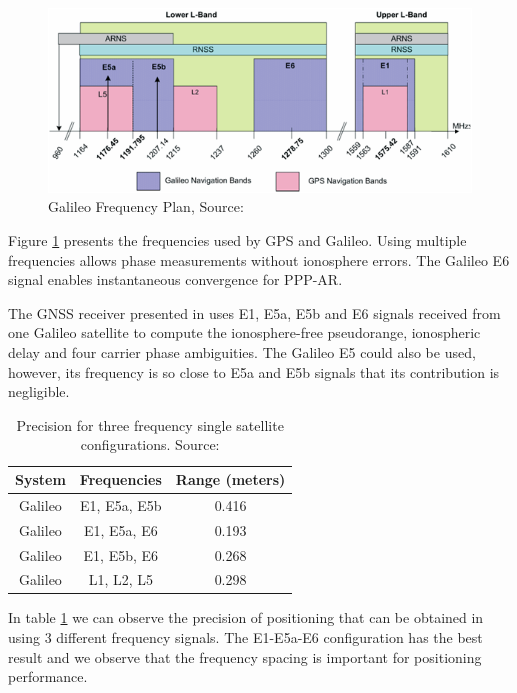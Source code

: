 \begin{figure}[h]
\centering
\includegraphics{img/Galileo_Frequency_Plan.png}
\caption{Galileo Frequency Plan, Source:\cite{galileoSisIcd}}
\label{fig:galileo_frequency_plan}
\end{figure}

Figure \ref{fig:galileo_frequency_plan} presents the frequencies used by GPS and Galileo. Using multiple frequencies allows phase measurements without ionosphere errors\cite{instantPPP}. The Galileo E6 signal enables instantaneous convergence for PPP-AR\cite{instantPPP}.

The GNSS receiver presented in \cite{instantPPP} uses E1, E5a, E5b and E6 signals received from one Galileo satellite to compute the ionosphere-free pseudorange, ionospheric delay and four carrier phase ambiguities\cite{instantPPP}. The Galileo E5 could also be used, however, its frequency is so close to E5a and E5b signals that its contribution is negligible\cite{instantPPP}.

\begin{table}[h!]
\centering
\begin{tabular}{|c|c|c|}
    \hline
    System & Frequencies & Range (meters) \\
    \hline
    Galileo & E1, E5a, E5b & 0.416 \\
    \hline
    Galileo & E1, E5a, E6 & 0.193 \\
    \hline
    Galileo & E1, E5b, E6 & 0.268 \\
    \hline
    Galileo & L1, L2, L5 & 0.298 \\
    \hline
\end{tabular}
\caption{Precision for three frequency single satellite configurations. Source: \cite{instantPPP}}
\label{table:20}
\end{table}

In table \ref{table:20} we can observe the precision of positioning that can be obtained in \cite{instantPPP} using 3 different frequency signals. The E1-E5a-E6 configuration has the best result and we observe that the frequency spacing is important for positioning performance.